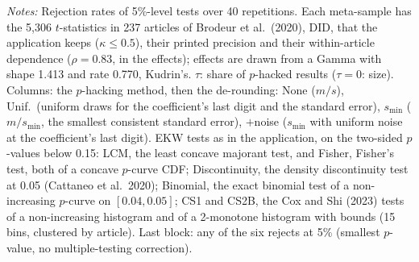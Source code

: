 \begin{table}[htbp]
\begin{minipage}{\linewidth}\footnotesize\textit{Notes:} Rejection rates of 5\%-level tests over 40 repetitions. Each meta-sample has the 5{,}306 $t$-statistics in 237 articles of Brodeur et al.\ (2020), DID, that the application keeps ($\kappa \le 0.5$), their printed precision and their within-article dependence ($\rho = 0.83$, in the effects); effects are drawn from a Gamma with shape 1.413 and rate 0.770, Kudrin's. $\tau$: share of $p$-hacked results ($\tau = 0$: size). Columns: the $p$-hacking method, then the de-rounding: None ($m/s$), Unif.\ (uniform draws for the coefficient's last digit and the standard error), $s_{\min}$ ($m/s_{\min}$, the smallest consistent standard error), $+$noise ($s_{\min}$ with uniform noise at the coefficient's last digit). EKW tests as in the application, on the two-sided $p$-values below 0.15: LCM, the least concave majorant test, and Fisher, Fisher's test, both of a concave $p$-curve CDF; Discontinuity, the density discontinuity test at 0.05 (Cattaneo et al.\ 2020); Binomial, the exact binomial test of a non-increasing $p$-curve on $[0.04, 0.05]$; CS1 and CS2B, the Cox and Shi (2023) tests of a non-increasing histogram and of a 2-monotone histogram with bounds (15 bins, clustered by article). Last block: any of the six rejects at 5\% (smallest $p$-value, no multiple-testing correction).\end{minipage}
\end{table}
